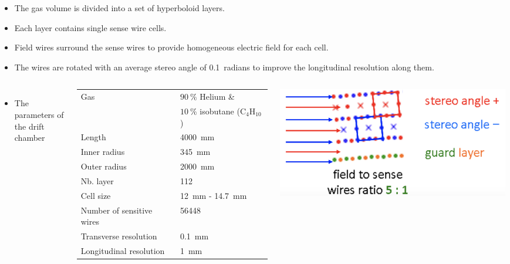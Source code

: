 \documentclass[final,xcolor={dvipsnames,svgnames,x11names,table}]{beamer}
\begin{document}
\begin{frame}
\begin{textblock}{43}
\begin{tcolorbox}[title=The IDEA drift chamber]
    \begin{itemize}
      \item The gas volume is divided into a set of hyperboloid layers.
      \item Each layer contains single sense wire cells.
      \item Field wires surround the sense wires to provide homogeneous electric field for each cell.
      \item The wires are rotated with an average stereo angle of 0.1~radians to improve the longitudinal resolution along them.
    \end{itemize}

    \begin{columns}
      \begin{itemize}
        \item The parameters of the drift chamber
      \end{itemize}

      \centering
      \begin{adjustbox}{max width=0.8\textwidth}
        \begin{tabular}{l l}
          \toprule
            Gas & $90~\%$ Helium \&\\
            & $10~\%$ isobutane ($\text{C}_{4}\text{H}_{10}$) \\
            Length & 4000~mm \\
            Inner radius & 345~mm \\
            Outer radius & 2000~mm\\
            Nb. layer & 112 \\
            Cell size & 12~mm - 14.7~mm \\
            Number of sensitive wires & 56448 \\
            Transverse resolution & 0.1~mm \\
            Longitudinal resolution & 1~mm \\
          \bottomrule
        \end{tabular}
      \end{adjustbox}

      \centering
      \includegraphics[width=\textwidth]{Figures/Field_sensWires.png}


\end{columns}
\end{tcolorbox}
\end{textblock}
\end{frame}
\end{document}
